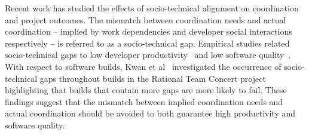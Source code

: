 Recent work has studied the effects of socio-technical alignment on coordination and project outcomes. The mismatch between coordination needs and actual coordination -- implied by work dependencies and developer social interactions respectively -- is referred to as a socio-technical gap. Empirical studies related socio-technical gaps to low developer productivity~\cite{valetto:msr:2007} and low software quality~\cite{kwan:tse:2011}.
With respect to software builds, Kwan et al~\cite{kwan:tse:2011} investigated the occurrence of socio-technical gaps throughout builds in the Rational Team Concert project highlighting that builds that contain more gaps are more likely to fail.
These findings suggest that the mismatch between implied coordination needs and actual coordination should be avoided to both guarantee high productivity and software quality.








